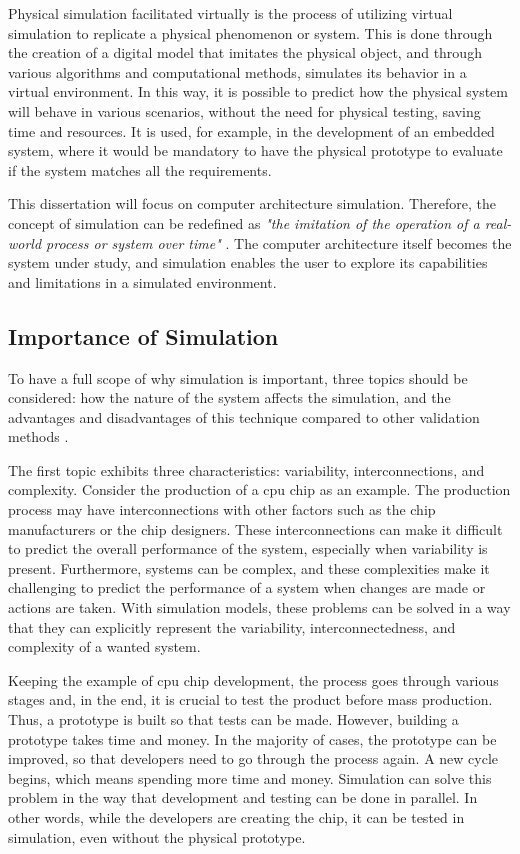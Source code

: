 Physical simulation facilitated virtually is the process of utilizing virtual simulation to replicate a physical phenomenon or system. This 
is done through the creation of a digital model that imitates the physical object, and through various algorithms and computational methods, 
simulates its behavior in a virtual environment. In this way, it is possible to predict how the physical system will behave in various scenarios, 
without the need for physical testing, saving time and resources. It is used, for example, in the development of an embedded system,  
where it would be mandatory to have the physical prototype to evaluate if the system matches all the requirements. 

This dissertation will focus on computer architecture simulation. Therefore, the concept of simulation can be redefined as \emph{"the imitation 
of the operation of a real-world process or system over time"} \cite{banks1999introduction}. The computer architecture itself becomes the system 
under study, and simulation enables the user to explore its capabilities and limitations in a simulated environment.

\subsection{Importance of Simulation}

To have a full scope of why simulation is important, three topics should be considered: how the nature of the system affects the simulation, and 
the advantages and disadvantages of this technique compared to other validation methods \cite{SimulationBook}.

The first topic exhibits three characteristics: variability, interconnections, and complexity. Consider the production of a \gls{cpu} chip as an 
example. The production process may have interconnections with other factors such as the chip manufacturers or the chip designers. These 
interconnections can make it difficult to predict the overall performance of the system,  
especially when variability is present. Furthermore, systems can be complex, and these complexities make it challenging to predict the performance 
of a system when changes are made or actions are taken. With simulation models, these problems can be solved in a way that they can explicitly 
represent the variability, interconnectedness, and complexity of a wanted system.

Keeping the example of \gls{cpu} chip development, the process goes through various stages and, in the end, it is crucial to test the product 
before mass production. Thus, a prototype is built so that tests can be made. However, building a prototype takes time and money. In the majority of 
cases, the prototype can be improved, so that developers need to go through the process again. A new cycle begins, which means spending more time 
and money. Simulation can solve this problem in the way that development and testing can be done in parallel. In other words, while the developers 
are creating the chip, it can be tested in simulation, even without the physical prototype. 

